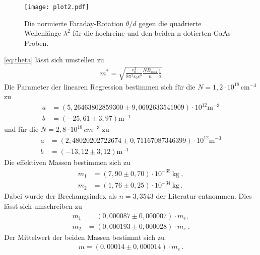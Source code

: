 \begin{figure}[hbt!]
  \texttt{[image: plot2.pdf]}
  \caption{Die normierte Faraday-Rotation $\theta/d$ gegen die quadrierte Wellenlänge $\lambda^2$ für die
  hochreine und den beiden n-dotierten GaAs-Proben.}
  \label{fig:diff}
\end{figure}
\autoref{eq:theta} lässt sich umstellen zu
 \begin{align*}
  m^{*} = \sqrt{\frac{e_0^3}{8\pi^2 \varepsilon_0 c^3} \frac{N B_\text{max}}{n} \frac{1}{a}}
  \end{align*}
Die Parameter der linearen Regression bestimmen sich für die $N=1,2\cdot 10^{18}\,\si{\centi\meter}^{-3}$ zu
\begin{align*}
  a &= (5,26463802859300 \pm 9,0692633541909) \cdot 10^{12} \si{\meter}^{-3} \\
  b &= (-25,61 \pm 3,97) \si{\meter}^{-1}
\end{align*}
und für die $N=2,8\cdot 10^{18}\,cm^{-3}$ zu
\begin{align*}
  a &= (2,48020202722674 \pm 0,71167087346399)\cdot 10^{12} \si{\meter}^{-3} \\
  b &= (-13,12 \pm 3,12) \si{\meter}^{-1}
\end{align*}
Die effektiven Massen bestimmen sich zu
\begin{align*}
  m_1 &= (7,90 \pm 0,70)\cdot 10^{-35}\,\si{\kilogram}\:, \\
  m_2 &= (1,76 \pm 0,25)\cdot 10^{-34}\,\si{\kilogram}\,.
\end{align*}
Dabei wurde der Brechungsindex als $n=3,3543$ der Literatur entnommen. \cite{Brechungsindex}
Dies lässt sich umschreiben zu
\begin{align*}
  m_1 &= (0,000087 \pm 0,000007)\cdot m_{e}, \\
  m_2 &= (0,000193 \pm 0,000028)\cdot m_{e}\: .
\end{align*}
Der Mittelwert der beiden Massen bestimmt sich zu
\begin{align*}
  m = (0,00014 \pm 0,000014)\cdot m_e \,.
\end{align*}